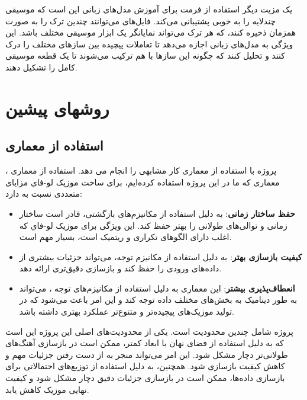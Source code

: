 یک مزیت دیگر استفاده از فرمت  برای آموزش مدل‌های زبانی این است که موسیقی چندلایه را به خوبی پشتیبانی می‌کند. فایل‌های  می‌توانند چندین ترک  را به صورت همزمان ذخیره کنند، که هر ترک می‌تواند نمایانگر یک ابزار موسیقی مختلف باشد. این ویژگی به مدل‌های زبانی اجازه می‌دهد تا تعاملات پیچیده بین سازهای مختلف را درک کنند و تحلیل کنند که چگونه این سازها با هم ترکیب می‌شوند تا یک قطعه موسیقی کامل را تشکیل دهند.

\section{روشهای پيشين}
\subsection{استفاده از معماری }
پروژه  \cite{Zhang} با استفاده از معماری  کار مشابهی را انجام می دهد.
استفاده از معماری ، معماری که ما در این پروژه استفاده کرده‌ایم، برای ساخت موزیک
ﻟﻮ-ﻓﺎﻱ  مزایای متعددی نسبت به   دارد:

\begin{itemize}
      \def\labelenumi{\arabic{enumi}.}
      \item
            \textbf{حفظ ساختار زمانی}:  به دلیل استفاده از مکانیزم‌های بازگشتی،
            قادر است ساختار زمانی و توالی‌های طولانی را بهتر حفظ کند. این ویژگی
            برای موزیک ﻟﻮ-ﻓﺎﻱ که اغلب دارای الگوهای تکراری و ریتمیک است، بسیار مهم
            است.
      \item
            \textbf{کیفیت بازسازی بهتر}:  به دلیل استفاده از مکانیزم توجه، می‌تواند جزئیات بیشتری از داده‌های ورودی را حفظ کند و بازسازی
            دقیق‌تری ارائه دهد.
      \item
            \textbf{انعطاف‌پذیری بیشتر}: این معماری به دلیل استفاده از مکانیزم‌های
            توجه ، می‌تواند به طور دینامیک به بخش‌های مختلف داده توجه کند و این امر
            باعث می‌شود که در تولید موزیک‌های پیچیده‌تر و متنوع‌تر عملکرد بهتری داشته
            باشد.
\end{itemize}

پروژه  شامل چندین محدودیت است. یکی از محدودیت‌های اصلی این پروژه این است که به دلیل استفاده از فضای نهان  با ابعاد کمتر، ممکن است در بازسازی آهنگ‌های طولانی‌تر دچار مشکل شود. این امر می‌تواند منجر به از دست رفتن جزئیات مهم و کاهش کیفیت بازسازی شود. همچنین،  به دلیل استفاده از توزیع‌های احتمالاتی برای بازسازی داده‌ها، ممکن است در بازسازی جزئیات دقیق دچار مشکل شود و کیفیت نهایی موزیک کاهش یابد.

